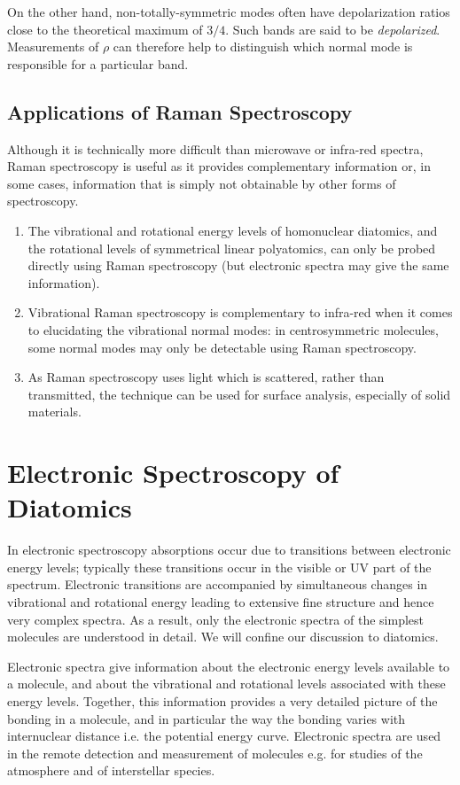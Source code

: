 \documentclass{article}
\theoremstyle{plain}\theoremheaderfont{\normalfont\itshape}\theorembodyfont{\rmfamily}\theoremseparator{.}\newtheorem*{rem}{Remark}\newtheorem*{ex}{Example}\newtheorem*{proof}{Proof}\newtheorem*{altp}{Alternative proof}
\theoremstyle{plain}\theoremheaderfont{\normalfont\bfseries}\theorembodyfont{\rmfamily}\theoremseparator{.}\newtheorem{thm}{Theorem}[section]\newtheorem{lem}[thm]{Lemma}\newtheorem{prop}[thm]{Proposition}\newtheorem*{cor}{Corollary}\newtheorem{defn}[thm]{Definition}\newtheorem{clm}[thm]{Claim}\newtheorem{clminproof}{Claim}\newtheorem{pos}{Postulate}[section]
\theoremstyle{break}\theoremheaderfont{\normalfont\itshape}\theorembodyfont{\rmfamily}\theoremseparator{.\medskip}\newtheorem*{proofskip}{Proof}\newtheorem*{exs}{Examples}\newtheorem*{rems}{Remarks}
\theoremstyle{break}\theoremheaderfont{\normalfont\bfseries}\theorembodyfont{\rmfamily}\theoremseparator{.\medskip}\newtheorem{lemskip}[thm]{Lemma}\newtheorem{defnskip}[thm]{Definition}\newtheorem{propskip}[thm]{Proposition}\newtheorem{thmskip}[thm]{Theorem}
\numberwithin{equation}{section}
\begin{document}
    On the other hand, non-totally-symmetric modes often have depolarization ratios close to the theoretical maximum of \(3/4\). Such bands are said to be \textit{depolarized}. Measurements of \(\rho\) can therefore help to distinguish which normal mode is responsible for a particular band.

    \subsection{Applications of Raman Spectroscopy}
    Although it is technically more difficult than microwave or infra-red spectra, Raman spectroscopy is useful as it provides complementary information or, in some cases, information that is simply not obtainable by other forms of spectroscopy.
    \begin{enumerate}[topsep=0pt,label=(\roman*)]
        \item The vibrational and rotational energy levels of homonuclear diatomics, and the rotational levels of symmetrical linear polyatomics, can only be probed directly using Raman spectroscopy (but electronic spectra may give the same information).
        \item Vibrational Raman spectroscopy is complementary to infra-red when it comes to elucidating the vibrational normal modes: in centrosymmetric molecules, some normal modes may only be detectable using Raman spectroscopy.
        \item As Raman spectroscopy uses light which is scattered, rather than transmitted, the technique can be used for surface analysis, especially of solid materials.
    \end{enumerate}

    \newpage

    \section{Electronic Spectroscopy of Diatomics}
    In electronic spectroscopy absorptions occur due to transitions between electronic energy levels; typically these transitions occur in the visible or UV part of the spectrum. Electronic transitions are accompanied by simultaneous changes in vibrational and rotational energy leading to extensive fine structure and hence very complex spectra. As a result, only the electronic spectra of the simplest molecules are understood in detail. We will confine our discussion to diatomics.

    Electronic spectra give information about the electronic energy levels available to a molecule, and about the vibrational and rotational levels associated with these energy levels. Together, this information provides a very detailed picture of the bonding in a molecule, and in particular the way the bonding varies with internuclear distance i.e. the potential energy curve. Electronic spectra are used in the remote detection and measurement of molecules e.g. for studies of the atmosphere and of interstellar species.
    
\end{document}
